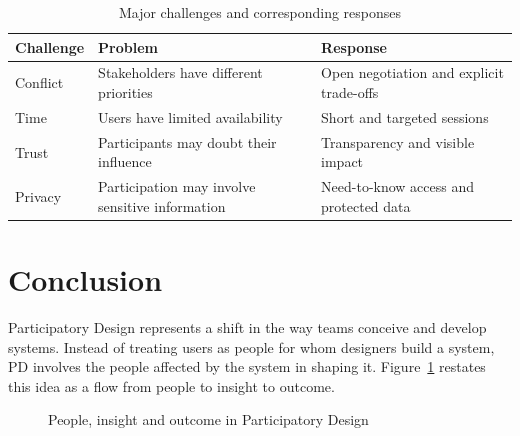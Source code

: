 \documentclass[a4paper,12pt]{article}
\begin{document}
\begin{table}[H]
\centering
\begin{tabularx}{\textwidth}{@{}l X X@{}}
\toprule
\rowcolor{myblue!20}
\textbf{Challenge} & \textbf{Problem} & \textbf{Response} \\
\midrule
Conflict & Stakeholders have different priorities &
Open negotiation and explicit trade-offs \\

Time & Users have limited availability &
Short and targeted sessions \\

Trust & Participants may doubt their influence &
Transparency and visible impact \\

Privacy & Participation may involve sensitive information &
Need-to-know access and protected data \\
\bottomrule
\end{tabularx}
\caption{Major challenges and corresponding responses}
\label{tab:challenge_response}
\end{table}

\section{Conclusion}
\label{sec:conclusion}

Participatory Design represents a shift in the way teams conceive and
develop systems. Instead of treating users as people for whom designers build
a system, PD involves the people affected by the system in shaping it.
Figure~\ref{fig:conclusionflow} restates this idea as a flow from people to
insight to outcome.

\begin{figure}[H]
\centering
{}
\caption{People, insight and outcome in Participatory Design}
\label{fig:conclusionflow}
\end{figure}
\end{document}
